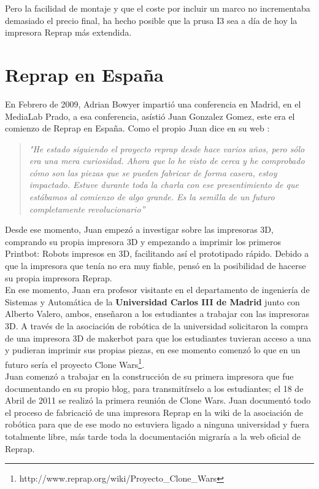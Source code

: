 Pero la facilidad de montaje y que el coste por incluir un marco no incrementaba demasiado el precio final, ha hecho posible que la prusa I3 sea a día de hoy la impresora Reprap más extendida.

\section{Reprap en España}

En Febrero de 2009, Adrian Bowyer impartió una conferencia en Madrid, en el MediaLab Prado, a esa conferencia, asístió Juan Gonzalez Gomez, este era el comienzo de Reprap en España. Como el propio Juan dice en su web \cite{juan1}:

\begin{quotation}
    \emph{
    "He estado siguiendo el proyecto reprap desde hace varios años, pero sólo era una mera curiosidad. Ahora que lo he visto de cerca y he comprobado cómo son las piezas que se pueden fabricar de forma casera, estoy impactado. Estuve durante toda la charla con ese presentimiento de que estábamos al comienzo de algo grande. Es la semilla de un futuro completamente revolucionario”}
\end{quotation}

Desde ese momento, Juan empezó a investigar sobre las impresoras 3D, comprando su propia impresora 3D \cite{juanR1} y empezando a imprimir los primeros Printbot: Robots impresos en 3D, facilitando así el prototipado rápido. Debido a que la impresora que tenía no era muy fiable, pensó en la posibilidad de hacerse su propia impresora Reprap.\\

En ese momento, Juan era profesor visitante en el departamento de ingeniería de Sistemas y Automática de la \textbf{Universidad Carlos III de Madrid} junto con Alberto Valero, ambos, enseñaron a los estudiantes a trabajar con las impresoras 3D. A través de la asociación de robótica de la universidad solicitaron la compra de una impresora 3D de makerbot para que los estudiantes tuvieran acceso a una y pudieran imprimir sus propias piezas, en ese momento comenzó lo que en un futuro sería el proyecto Clone Wars\footnote{http://www.reprap.org/wiki/Proyecto\_Clone\_Wars}.\\

Juan comenzó a trabajar en la construcción de su primera impresora que fue documentando en su propio blog, para transmitírselo a los estudiantes; el 18 de Abril de 2011 se realizó la primera reunión de Clone Wars. Juan documentó todo el proceso de fabricació de una impresora Reprap en la wiki de la asociación de robótica para que de ese modo no estuviera ligado a ninguna universidad y fuera totalmente libre, más tarde toda la documentación migraría a la web oficial de Reprap.\\
